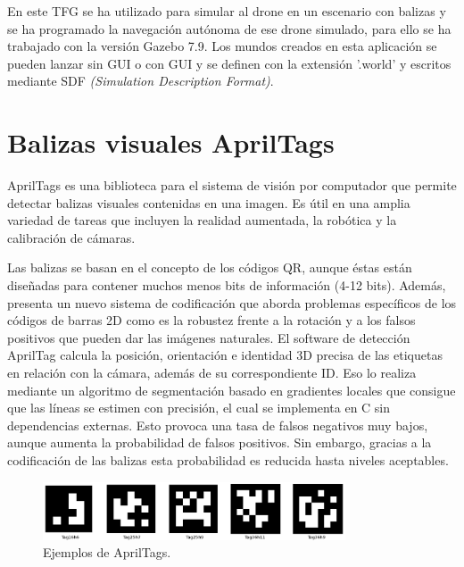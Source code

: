 \hspace{1cm} En este TFG se ha utilizado para simular al drone en un escenario con balizas y se ha programado la navegación autónoma de ese drone simulado, para ello se ha trabajado con la versión Gazebo 7.9. Los mundos creados en esta aplicación se pueden lanzar sin GUI o con GUI y se definen con la extensión '.world' y escritos mediante SDF \textit{(Simulation Description Format)}.

\section{Balizas visuales AprilTags}
\hspace{1cm} AprilTags \cite{AprilTags2} es una biblioteca para el sistema de visión por computador que permite detectar balizas visuales contenidas en una imagen. Es útil en una amplia variedad de tareas que incluyen la realidad aumentada, la robótica y la calibración de cámaras.

\hspace{1cm} Las balizas se basan en el concepto de los códigos QR, aunque éstas están diseñadas para contener muchos menos bits de información (4-12 bits). Además, presenta un nuevo sistema de codificación que aborda problemas específicos de los códigos de barras 2D como es la robustez frente a la rotación y a los falsos positivos que pueden dar las imágenes naturales. El software de detección AprilTag calcula la posición, orientación e identidad 3D precisa de las etiquetas en relación con la cámara, además de su correspondiente ID. Eso lo realiza mediante un algoritmo de segmentación basado en gradientes locales que consigue que las líneas se estimen con precisión, el cual se implementa en C sin dependencias externas. Esto provoca una tasa de falsos negativos muy bajos, aunque aumenta la probabilidad de falsos positivos. Sin embargo, gracias a la codificación de las balizas esta probabilidad es reducida hasta niveles aceptables.
\\

\begin{figure}[H]
	\begin{center}
		\includegraphics[width=0.8\textwidth]{imag/IMG25.png}
				\caption{Ejemplos de AprilTags.} 
	\label{fig:AprilTags.}	
	\end{center}
\end{figure}

